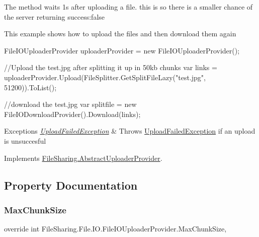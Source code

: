 The method waits 1s after uploading a file. this is so there is a smaller chance of the server returning success\+:false 

This example shows how to upload the files and then download them again 
\begin{DoxyCode}
FileIOUploaderProvider uploaderProvider = \textcolor{keyword}{new} FileIOUploaderProvider();

\textcolor{comment}{//Upload the test.jpg after splitting it up in 50kb chunks}
var links = uploaderProvider.Upload(FileSplitter.GetSplitFileLazy(\textcolor{stringliteral}{"test.jpg"}, 51200)).ToList();

\textcolor{comment}{//download the test.jpg}
var splitfile = \textcolor{keyword}{new} FileIODownloadProvider().Download(links);
\end{DoxyCode}
 


\begin{DoxyExceptions}{Exceptions}
{\em \hyperlink{class_file_sharing_1_1_upload_failed_exception}{Upload\+Failed\+Exception}} & Throws \hyperlink{class_file_sharing_1_1_upload_failed_exception}{Upload\+Failed\+Exception} if an upload is unsuccesful \\
\hline
\end{DoxyExceptions}


Implements \hyperlink{class_file_sharing_1_1_abstract_uploader_provider_a951930bd16d0cfd061fa2dfd055e2601}{File\+Sharing.\+Abstract\+Uploader\+Provider}.



\subsection{Property Documentation}
\mbox{\label{class_file_sharing_1_1_file_1_1_i_o_1_1_file_i_o_uploader_provider_aece58c355e86215e63487ad62831f33c}} 
\subsubsection{\texorpdfstring{Max\+Chunk\+Size}{MaxChunkSize}}
{\footnotesize\ttfamily override int File\+Sharing.\+File.\+I\+O.\+File\+I\+O\+Uploader\+Provider.\+Max\+Chunk\+Size\hspace{0.3cm}{\ttfamily [get]}, {}}




